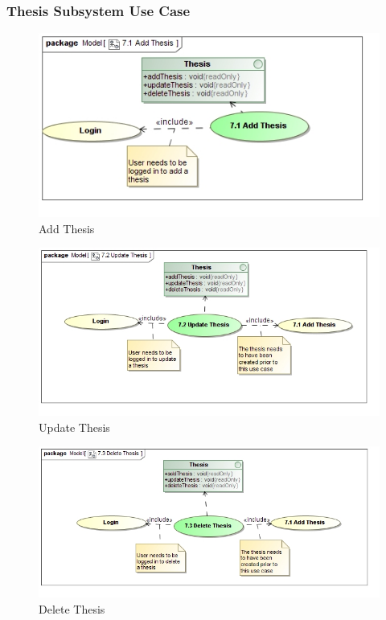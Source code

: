 \documentclass{article}
\begin{document}
			\subsubsection{Thesis Subsystem Use Case}
				\begin{figure}
					\includegraphics[width=\textwidth]{5.3-SS5-7/Add-Thesis}
					\caption{Add Thesis}
				\end{figure}
				\begin{figure}
					\includegraphics[width=\textwidth]{5.3-SS5-7/Update-Thesis}
					\caption{Update Thesis}
				\end{figure}
				\begin{figure}
					\includegraphics[width=\textwidth]{5.3-SS5-7/Delete-Thesis}
					\caption{Delete Thesis}
				\end{figure}
\end{document}
